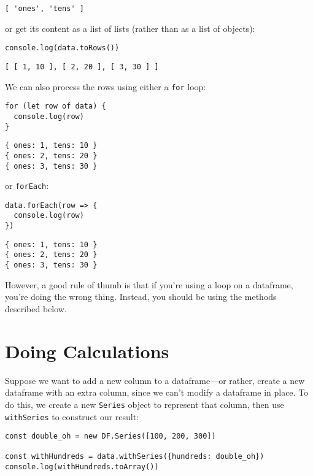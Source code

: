 \begin{verbatim}
[ 'ones', 'tens' ]
\end{verbatim}

\noindent
or get its content as a list of lists (rather than as a list of objects):

\begin{verbatim}
console.log(data.toRows())
\end{verbatim}

\begin{verbatim}
[ [ 1, 10 ], [ 2, 20 ], [ 3, 30 ] ]
\end{verbatim}

We can also process the rows using either a \texttt{for} loop:

\begin{verbatim}
for (let row of data) {
  console.log(row)
}
\end{verbatim}

\begin{verbatim}
{ ones: 1, tens: 10 }
{ ones: 2, tens: 20 }
{ ones: 3, tens: 30 }
\end{verbatim}

\noindent
or \texttt{forEach}:

\begin{verbatim}
data.forEach(row => {
  console.log(row)
})
\end{verbatim}

\begin{verbatim}
{ ones: 1, tens: 10 }
{ ones: 2, tens: 20 }
{ ones: 3, tens: 30 }
\end{verbatim}

\noindent
However,
a good rule of thumb is that if you're using a loop on a dataframe,
you're doing the wrong thing.
Instead,
you should be using the methods described below.

\section{Doing Calculations}\label{s:dataforge-calc}

Suppose we want to add a new column to a dataframe---or rather,
create a new dataframe with an extra column,
since we can't modify a dataframe in place.
To do this,
we create a new \texttt{Series} object to represent that column,
then use \texttt{withSeries} to construct our result:

\begin{verbatim}
const double_oh = new DF.Series([100, 200, 300])

const withHundreds = data.withSeries({hundreds: double_oh})
console.log(withHundreds.toArray())
\end{verbatim}

